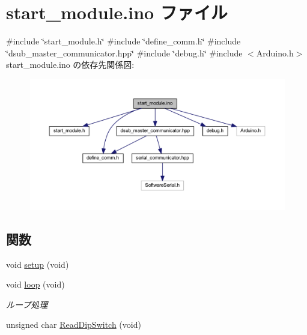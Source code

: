 \hypertarget{start__module_8ino}{}\section{start\+\_\+module.\+ino ファイル}
\label{start__module_8ino}
{\ttfamily \#include \char`\"{}start\+\_\+module.\+h\char`\"{}}\newline
{\ttfamily \#include \char`\"{}define\+\_\+comm.\+h\char`\"{}}\newline
{\ttfamily \#include \char`\"{}dsub\+\_\+master\+\_\+communicator.\+hpp\char`\"{}}\newline
{\ttfamily \#include \char`\"{}debug.\+h\char`\"{}}\newline
{\ttfamily \#include $<$Arduino.\+h$>$}\newline
start\+\_\+module.\+ino の依存先関係図\+:\nopagebreak
\begin{figure}[H]
\begin{center}
\leavevmode
\includegraphics[width=350pt]{start__module_8ino__incl}
\end{center}
\end{figure}
\subsection*{関数}
\begin{DoxyCompactItemize}
\item 
void \mbox{\hyperlink{start__module_8ino_a7dfd9b79bc5a37d7df40207afbc5431f}{setup}} (void)
\item 
void \mbox{\hyperlink{start__module_8ino_a0b33edabd7f1c4e4a0bf32c67269be2f}{loop}} (void)
\begin{DoxyCompactList}\small\item\em ループ処理 \end{DoxyCompactList}\item 
unsigned char \mbox{\hyperlink{start__module_8ino_a77b0a767d95108a48a54b857588d2863}{Read\+Dip\+Switch}} (void)
\end{DoxyCompactItemize}
